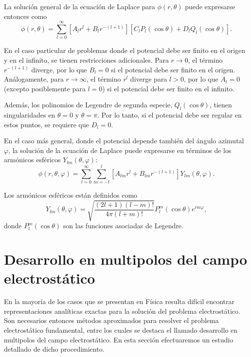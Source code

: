 \documentclass[12pt,a4paper]{book}
\begin{document}
La solución general de la ecuación de Laplace para $\phi(r, \theta)$ puede expresarse entonces como
\begin{equation}
\phi(r, \theta) = \sum_{l=0}^{\infty}\left[A_l r^l + B_l r^{-(l+1)}\right]\left[C_l P_l(\cos\theta) + D_l Q_l(\cos\theta)\right].
\end{equation}

En el caso particular de problemas donde el potencial debe ser finito en el origen y en el infinito, se tienen restricciones adicionales. Para $r \to 0$, el término $r^{-(l+1)}$ diverge, por lo que $B_l = 0$ si el potencial debe ser finito en el origen. Análogamente, para $r \to \infty$, el término $r^l$ diverge para $l > 0$, por lo que $A_l = 0$ (excepto posiblemente para $l = 0$) si el potencial debe ser finito en el infinito.

Además, los polinomios de Legendre de segunda especie, $Q_l(\cos\theta)$, tienen singularidades en $\theta = 0$ y $\theta = \pi$. Por lo tanto, si el potencial debe ser regular en estos puntos, se requiere que $D_l = 0$.

En el caso más general, donde el potencial depende también del ángulo azimutal $\varphi$, la solución de la ecuación de Laplace puede expresarse en términos de los armónicos esféricos $Y_{lm}(\theta, \varphi)$:
\begin{equation}
\phi(r, \theta, \varphi) = \sum_{l=0}^{\infty}\sum_{m=-l}^{l}\left[A_{lm}r^l + B_{lm}r^{-(l+1)}\right]Y_{lm}(\theta, \varphi).
\end{equation}

Los armónicos esféricos están definidos como
\begin{equation}
Y_{lm}(\theta, \varphi) = \sqrt{\frac{(2l+1)(l-m)!}{4\pi(l+m)!}}P_l^m(\cos\theta)e^{im\varphi},
\end{equation}
donde $P_l^m(\cos\theta)$ son las funciones asociadas de Legendre.

\section{Desarrollo en multipolos del campo electrostático}

En la mayoría de los casos que se presentan en Física resulta difícil encontrar representaciones analíticas exactas para la solución del problema electrostático. Son necesarios entonces métodos aproximados para resolver el problema electrostático fundamental, entre los cuales se destaca el llamado desarrollo en multipolos del campo electrostático. En esta sección efectuaremos un estudio detallado de dicho procedimiento.
\end{document}
